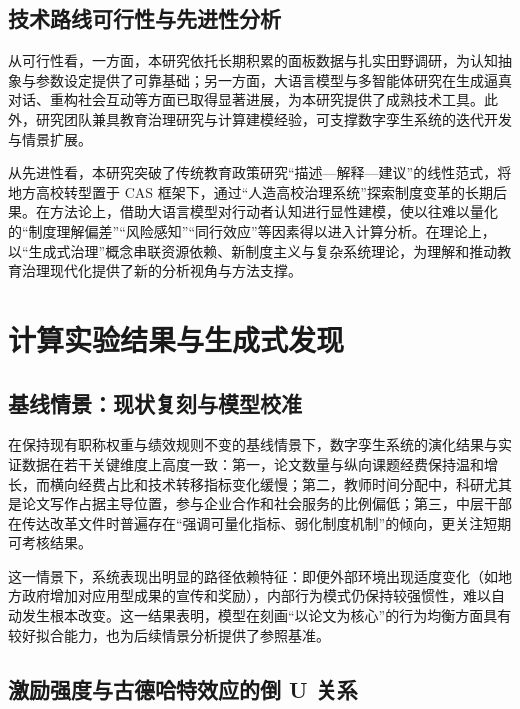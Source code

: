 \documentclass[UTF8, zihao=-4, fontset=mac]{ctexart}
\begin{document}
\subsection{技术路线可行性与先进性分析}

从可行性看，一方面，本研究依托长期积累的面板数据与扎实田野调研，为认知抽象与参数设定提供了可靠基础；另一方面，大语言模型与多智能体研究在生成逼真对话、重构社会互动等方面已取得显著进展，为本研究提供了成熟技术工具\cite{park2023generative, hong2023metagpt, sumers2023cognitive}。此外，研究团队兼具教育治理研究与计算建模经验，可支撑数字孪生系统的迭代开发与情景扩展。

从先进性看，本研究突破了传统教育政策研究“描述—解释—建议”的线性范式，将地方高校转型置于 CAS 框架下，通过“人造高校治理系统”探索制度变革的长期后果。在方法论上，借助大语言模型对行动者认知进行显性建模，使以往难以量化的“制度理解偏差”“风险感知”“同行效应”等因素得以进入计算分析。在理论上，以“生成式治理”概念串联资源依赖、新制度主义与复杂系统理论，为理解和推动教育治理现代化提供了新的分析视角与方法支撑。

\section{计算实验结果与生成式发现}

\subsection{基线情景：现状复刻与模型校准}

在保持现有职称权重与绩效规则不变的基线情景下，数字孪生系统的演化结果与实证数据在若干关键维度上高度一致：第一，论文数量与纵向课题经费保持温和增长，而横向经费占比和技术转移指标变化缓慢；第二，教师时间分配中，科研尤其是论文写作占据主导位置，参与企业合作和社会服务的比例偏低；第三，中层干部在传达改革文件时普遍存在“强调可量化指标、弱化制度机制”的倾向，更关注短期可考核结果。

这一情景下，系统表现出明显的路径依赖特征：即便外部环境出现适度变化（如地方政府增加对应用型成果的宣传和奖励），内部行为模式仍保持较强惯性，难以自动发生根本改变。这一结果表明，模型在刻画“以论文为核心”的行为均衡方面具有较好拟合能力，也为后续情景分析提供了参照基准。

\subsection{激励强度与古德哈特效应的倒 U 关系}
\end{document}
